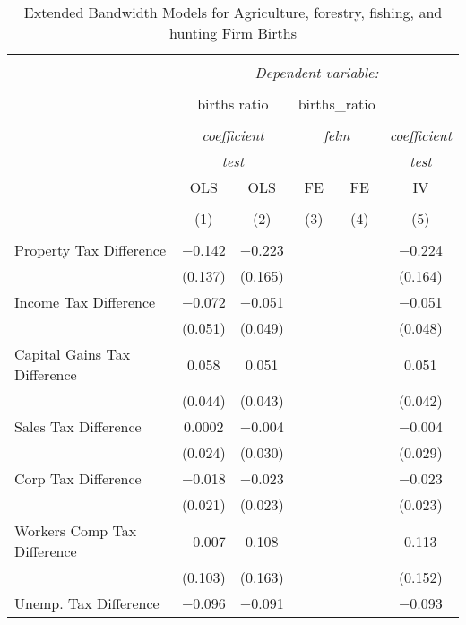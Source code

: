 
\begin{table}[!htbp] \centering 
  \caption{Extended Bandwidth Models for  Agriculture, forestry, fishing, and hunting Firm Births} 
  \label{} 
\begin{tabular}{@{\extracolsep{5pt}}lccccc} 
\\[-1.8ex]\hline 
\hline \\[-1.8ex] 
 & \multicolumn{5}{c}{\textit{Dependent variable:}} \\ 
\cline{2-6} 
\\[-1.8ex] & \multicolumn{2}{c}{births ratio} & \multicolumn{2}{c}{births\_ratio} &   \\ 
\\[-1.8ex] & \multicolumn{2}{c}{\textit{coefficient}} & \multicolumn{2}{c}{\textit{felm}} & \textit{coefficient} \\ 
 & \multicolumn{2}{c}{\textit{test}} & \multicolumn{2}{c}{\textit{}} & \textit{test} \\ 
 & OLS & OLS & FE & FE & IV \\ 
\\[-1.8ex] & (1) & (2) & (3) & (4) & (5)\\ 
\hline \\[-1.8ex] 
 Property Tax Difference & $-$0.142 & $-$0.223 &  &  & $-$0.224 \\ 
  & (0.137) & (0.165) &  &  & (0.164) \\ 
  Income Tax Difference & $-$0.072 & $-$0.051 &  &  & $-$0.051 \\ 
  & (0.051) & (0.049) &  &  & (0.048) \\ 
  Capital Gains Tax Difference & 0.058 & 0.051 &  &  & 0.051 \\ 
  & (0.044) & (0.043) &  &  & (0.042) \\ 
  Sales Tax Difference & 0.0002 & $-$0.004 &  &  & $-$0.004 \\ 
  & (0.024) & (0.030) &  &  & (0.029) \\ 
  Corp Tax Difference & $-$0.018 & $-$0.023 &  &  & $-$0.023 \\ 
  & (0.021) & (0.023) &  &  & (0.023) \\ 
  Workers Comp Tax Difference & $-$0.007 & 0.108 &  &  & 0.113 \\ 
  & (0.103) & (0.163) &  &  & (0.152) \\ 
  Unemp. Tax Difference & $-$0.096 & $-$0.091 &  &  & $-$0.093 \\ 

\end{tabular}
\end{table}

